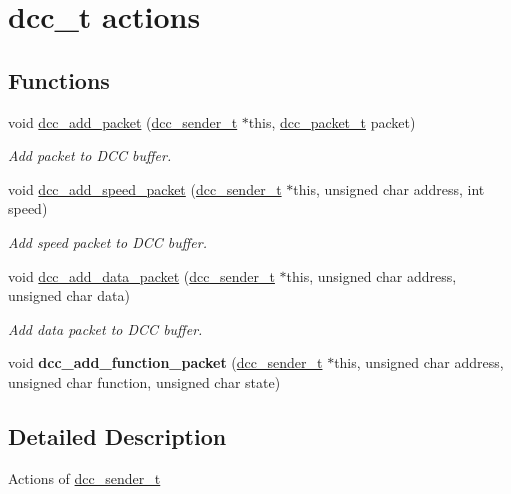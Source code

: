 \hypertarget{group__dcc__t__actions}{\section{dcc\-\_\-t actions}
\label{group__dcc__t__actions}
}
\subsection*{Functions}
\begin{DoxyCompactItemize}
\item 
void \hyperlink{group__dcc__t__actions_gacb4f29b0b7c35730b6fe1bd716041ea2}{dcc\-\_\-add\-\_\-packet} (\hyperlink{structdcc__sender__t}{dcc\-\_\-sender\-\_\-t} $\ast$this, \hyperlink{structdcc__packet__t}{dcc\-\_\-packet\-\_\-t} packet)
\begin{DoxyCompactList}\small\item\em Add packet to D\-C\-C buffer. \end{DoxyCompactList}\item 
void \hyperlink{group__dcc__t__actions_gaaf362a49f668badd91f596f581cd2ba6}{dcc\-\_\-add\-\_\-speed\-\_\-packet} (\hyperlink{structdcc__sender__t}{dcc\-\_\-sender\-\_\-t} $\ast$this, unsigned char address, int speed)
\begin{DoxyCompactList}\small\item\em Add speed packet to D\-C\-C buffer. \end{DoxyCompactList}\item 
void \hyperlink{group__dcc__t__actions_ga3c44ba8b3f884a558aa4d06ef945e7c7}{dcc\-\_\-add\-\_\-data\-\_\-packet} (\hyperlink{structdcc__sender__t}{dcc\-\_\-sender\-\_\-t} $\ast$this, unsigned char address, unsigned char data)
\begin{DoxyCompactList}\small\item\em Add data packet to D\-C\-C buffer. \end{DoxyCompactList}\item 
\hypertarget{group__dcc__t__actions_gadde12081b6782aab96f05029932c8b30}{void {\bfseries dcc\-\_\-add\-\_\-function\-\_\-packet} (\hyperlink{structdcc__sender__t}{dcc\-\_\-sender\-\_\-t} $\ast$this, unsigned char address, unsigned char function, unsigned char state)}\label{group__dcc__t__actions_gadde12081b6782aab96f05029932c8b30}

\end{DoxyCompactItemize}


\subsection{Detailed Description}
Actions of \hyperlink{structdcc__sender__t}{dcc\-\_\-sender\-\_\-t} 

